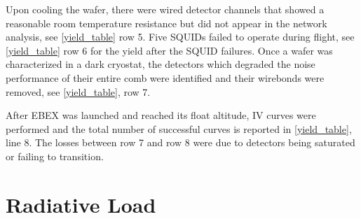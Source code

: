 Upon cooling the wafer, there were wired detector channels that showed a reasonable room temperature resistance but did not appear in the network analysis, see \TAB\ref{yield_table} row 5. 
Five \ac{SQUID}s failed to operate during flight, see \TAB\ref{yield_table} row 6 for the yield after the \ac{SQUID} failures. 
Once a wafer was characterized in a dark cryostat, the detectors which degraded the noise performance of their entire comb were identified and their wirebonds were removed, see \TAB\ref{yield_table}, row 7. 

After \ac{EBEX} was launched and reached its float altitude, IV curves were performed and the total number of successful curves is reported in \TAB\ref{yield_table}, line 8. 
The losses between row 7 and row 8 were due to detectors being saturated or failing to transition. 

%
%



\section{Radiative Load}
\label{sec:radiative_load}

